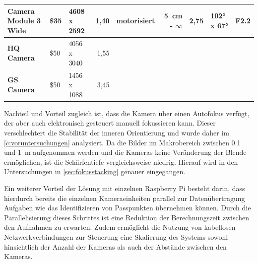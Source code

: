 \documentclass[./00PhotoBox.tex]{subfiles}
\begin{document}
\begin{table}
{\begin{tabular}{l|l|l|r|lr|r|l|r|}
            \multicolumn{1}{|l|}{\textbf{Camera Module 3 Wide}} & \$35                         & \cellcolor[HTML]{9AFF99}4608 x 2592                                  & 1,40                                                              & \multicolumn{1}{l|}{\cellcolor[HTML]{9AFF99}motorisiert}                    & \cellcolor[HTML]{9AFF99}\SI{5}{\centi\metre} - $\infty$                  & 2,75                     & 102° x 67°               & F2.2                         \\ \hline
            \multicolumn{1}{|l|}{\textbf{HQ Camera}}            & \cellcolor[HTML]{FFCCC9}\$50 & 4056 x 3040                                                          & 1,55                                                              & \multicolumn{1}{l|}{\cellcolor[HTML]{FFCCC9}{\color[HTML]{000000} manuell}} & \cellcolor[HTML]{C0C0C0}                                                 & \cellcolor[HTML]{C0C0C0} & \cellcolor[HTML]{C0C0C0} & \cellcolor[HTML]{C0C0C0}     \\ \hline
            \multicolumn{1}{|l|}{\textbf{GS Camera}}            & \cellcolor[HTML]{FFCCC9}\$50 & 1456 x 1088                                                          & \cellcolor[HTML]{9AFF99}3,45                                      & \multicolumn{1}{l|}{\cellcolor[HTML]{FFCCC9}{\color[HTML]{000000} manuell}} & \cellcolor[HTML]{C0C0C0}                                                 & \cellcolor[HTML]{C0C0C0} & \cellcolor[HTML]{C0C0C0} & \cellcolor[HTML]{C0C0C0}     \\ \hline
        \end{tabular}
    }
\end{table}

Nachteil und Vorteil zugleich ist, dass die Kamera über einen Autofokus verfügt, der aber auch elektronisch gesteuert manuell fokussieren kann. Dieser verschlechtert die Stabilität der inneren Orientierung und wurde daher im \autoref{c:voruntersuchungen} analysiert. Da die Bilder im Makrobereich zwischen \SI{0,1}{} und \SI{1}{\metre} aufgenommen werden und die Kameras keine Veränderung der Blende ermöglichen, ist die Schärfentiefe vergleichsweise niedrig. Hierauf wird in den Untersuchungen in \autoref{sec:fokusstacking} genauer eingegangen. 

Ein weiterer Vorteil der Lösung mit einzelnen Raspberry Pi besteht darin, dass hierdurch bereits die einzelnen Kameraeinheiten parallel zur Datenübertragung Aufgaben wie das Identifizieren von Passpunkten übernehmen können. Durch die Parallelisierung dieses Schrittes ist eine Reduktion der Berechnungszeit zwischen den Aufnahmen zu erwarten. Zudem ermöglicht die Nutzung von kabellosen Netzwerkverbindungen zur Steuerung eine Skalierung des Systems sowohl hinsichtlich der Anzahl der Kameras als auch der Abstände zwischen den Kameras.
\end{document}
